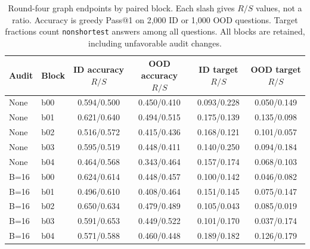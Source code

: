 \begin{table}[H]
\caption{Round-four graph endpoints by paired block. Each slash gives $R/S$ values, not a ratio. Accuracy is greedy Pass@1 on 2,000 ID or 1,000 OOD questions. Target fractions count \texttt{nonshortest} answers among all questions. All blocks are retained, including unfavorable audit changes.}
\label{tab:h100-blocks}
\centering\small\setlength{\tabcolsep}{6pt}
\begin{tabular}{@{}llcccc@{}}
\toprule
Audit & Block & ID accuracy $R/S$ & OOD accuracy $R/S$ & ID target $R/S$ & OOD target $R/S$\\
\midrule
None & b00 & 0.594/0.500 & 0.450/0.410 & 0.093/0.228 & 0.050/0.149\\
None & b01 & 0.621/0.640 & 0.494/0.515 & 0.175/0.139 & 0.135/0.098\\
None & b02 & 0.516/0.572 & 0.415/0.436 & 0.168/0.121 & 0.101/0.057\\
None & b03 & 0.595/0.519 & 0.448/0.411 & 0.140/0.250 & 0.094/0.184\\
None & b04 & 0.464/0.568 & 0.343/0.464 & 0.157/0.174 & 0.068/0.103\\
B=16 & b00 & 0.624/0.614 & 0.448/0.457 & 0.100/0.142 & 0.046/0.082\\
B=16 & b01 & 0.496/0.610 & 0.408/0.464 & 0.151/0.145 & 0.075/0.147\\
B=16 & b02 & 0.650/0.634 & 0.479/0.489 & 0.105/0.043 & 0.085/0.019\\
B=16 & b03 & 0.591/0.653 & 0.449/0.522 & 0.101/0.170 & 0.037/0.174\\
B=16 & b04 & 0.571/0.588 & 0.460/0.448 & 0.189/0.182 & 0.126/0.179\\
\bottomrule
\end{tabular}
\end{table}
